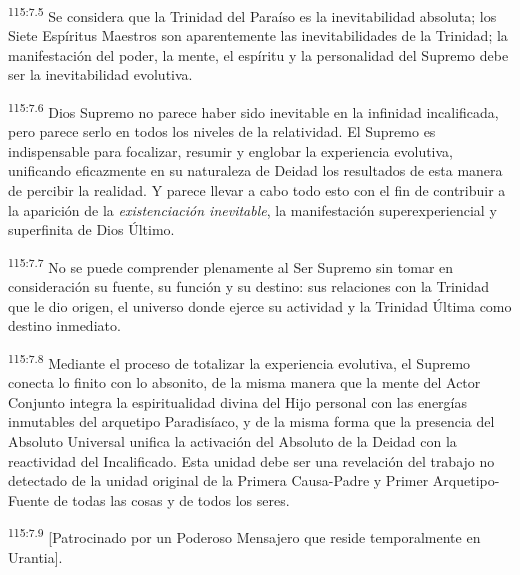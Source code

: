\par
\textsuperscript{115:7.5} Se considera que la Trinidad del Paraíso es la inevitabilidad absoluta; los Siete Espíritus Maestros son aparentemente las inevitabilidades de la Trinidad; la manifestación del poder, la mente, el espíritu y la personalidad del Supremo debe ser la inevitabilidad evolutiva.

\par
\textsuperscript{115:7.6} Dios Supremo no parece haber sido inevitable en la infinidad incalificada, pero parece serlo en todos los niveles de la relatividad. El Supremo es indispensable para focalizar, resumir y englobar la experiencia evolutiva, unificando eficazmente en su naturaleza de Deidad los resultados de esta manera de percibir la realidad. Y parece llevar a cabo todo esto con el fin de contribuir a la aparición de la \textit{existenciación inevitable}, la manifestación superexperiencial y superfinita de Dios Último.

\par
\textsuperscript{115:7.7} No se puede comprender plenamente al Ser Supremo sin tomar en consideración su fuente, su función y su destino: sus relaciones con la Trinidad que le dio origen, el universo donde ejerce su actividad y la Trinidad Última como destino inmediato.

\par
\textsuperscript{115:7.8} Mediante el proceso de totalizar la experiencia evolutiva, el Supremo conecta lo finito con lo absonito, de la misma manera que la mente del Actor Conjunto integra la espiritualidad divina del Hijo personal con las energías inmutables del arquetipo Paradisíaco, y de la misma forma que la presencia del Absoluto Universal unifica la activación del Absoluto de la Deidad con la reactividad del Incalificado. Esta unidad debe ser una revelación del trabajo no detectado de la unidad original de la Primera Causa-Padre y Primer Arquetipo-Fuente de todas las cosas y de todos los seres.

\par
\textsuperscript{115:7.9} [Patrocinado por un Poderoso Mensajero que reside temporalmente en Urantia].